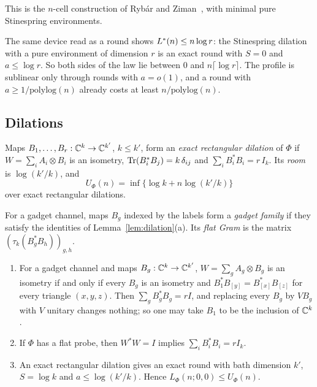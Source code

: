 This is the $n$-cell construction of Ryb\'ar and Ziman~\cite[Section~III]{RybarZiman2008}, with minimal pure Stinespring environments.

The same device read as a round shows $L^{*}(n)\le n\log r$: the Stinespring dilation with a pure environment of dimension $r$ is an exact round
with $S=0$ and $a\le\log r$. So both sides of the law lie between $0$ and $n\lceil\log r\rceil$. The profile is sublinear only through
rounds with $a=o(1)$, and a round with $a\ge1/\mathrm{polylog}(n)$ already costs at least $n/\mathrm{polylog}(n)$.

\subsection{Dilations}

\begin{definition}\label{def:dilation}
Maps $B_1,\dots,B_r:\mathbb C^k\to\mathbb C^{k'}$, $k\le k'$, form an \emph{exact rectangular dilation} of $\Phi$ if $W=\sum_iA_i\otimes B_i$ is an isometry,
$\operatorname{Tr}(B_i^*B_j)=k\,\delta_{ij}$ and $\sum_iB_i^*B_i=r\,I_k$. Its \emph{room} is $\log(k'/k)$, and
\[
U_\Phi(n)=\inf\bigl\{\log k+n\log(k'/k)\bigr\}
\]
over exact rectangular dilations.
\end{definition}

For a gadget channel, maps $B_g$ indexed by the labels form a \emph{gadget family} if they satisfy the identities of
Lemma~\ref{lem:dilation}(a). Its \emph{flat Gram} is the matrix $(\tau_k(B_g^*B_h))_{g,h}$.

\begin{lemma}\label{lem:dilation}
\begin{enumerate}[label=(\alph*),itemsep=1pt]
\item For a gadget channel and maps $B_g:\mathbb C^k\to\mathbb C^{k'}$, $W=\sum_gA_g\otimes B_g$ is an isometry if and only if every $B_g$ is an isometry and
$B_1^*B_{[y]}=B_{[x]}^*B_{[z]}$ for every triangle $(x,y,z)$. Then $\sum_gB_g^*B_g=rI$, and replacing every $B_g$ by $VB_g$ with $V$ unitary
changes nothing; so one may take $B_1$ to be the inclusion of $\mathbb C^k$.
\item If $\Phi$ has a flat probe, then $W^*W=I$ implies $\sum_iB_i^*B_i=rI_k$.
\item An exact rectangular dilation gives an exact round with bath dimension $k'$, $S=\log k$ and $a\le\log(k'/k)$. Hence
$L_\Phi(n;0,0)\le U_\Phi(n)$.
\end{enumerate}
\end{lemma}

